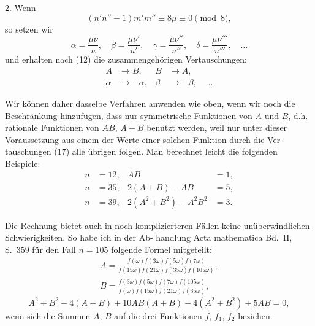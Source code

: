 \documentclass[12pt,a4paper]{article}
\theoremstyle{definition}
\begin{document}
2. Wenn
\begin{equation}\tag{20}
(n'n'' - 1)m'm'' \equiv 8\mu \equiv 0 \pmod{8},
\end{equation}
so setzen wir
\begin{equation}
\alpha = \frac{\mu \nu}{u}, \quad
\beta = \frac{\mu \nu'}{u'}, \quad
\gamma = \frac{\mu \nu''}{u''}, \quad
\delta = \frac{\mu \nu'''}{u'''}, \quad \ldots
\end{equation}
und erhalten nach (12) die zusammengeh\"origen Vertauschungen:
\begin{equation}\tag{21}
\begin{aligned}
A &\rightarrow B, & B &\rightarrow A, \\
\alpha &\rightarrow -\alpha, & \beta &\rightarrow -\beta, \quad \ldots
\end{aligned}
\end{equation}

Wir k\"onnen daher dasselbe Verfahren anwenden wie oben, wenn
wir noch die Beschr\"ankung hinzuf\"ugen, dass nur symmetrische
Funktionen von $A$ und $B$, d.h. rationale Funktionen von $AB$,
$A + B$ benutzt werden, weil nur unter dieser Voraussetzung
aus einem der Werte einer solchen Funktion durch die Ver-
tauschungen (17) alle \"ubrigen folgen. Man berechnet leicht die
folgenden Beispiele:
\begin{equation}\tag{22}
\begin{aligned}
n &= 12, & AB &= 1, \\
n &= 35, & 2(A+B) - AB &= 5, \\
n &= 39, & 2(A^2+B^2) - A^2B^2 &= 3.
\end{aligned}
\end{equation}

Die Rechnung bietet auch in noch komplizierteren F\"allen
keine un\"uberwindlichen Schwierigkeiten. So habe ich in der Ab-
handlung Acta mathematica Bd.~II, S.~359 f\"ur den Fall $n = 105$
folgende Formel mitgeteilt:
\begin{gather*}
A = \frac{f(\omega)f(3\omega)f(5\omega)f(7\omega)}{f(15\omega)f(21\omega)f(35\omega)f(105\omega)}, \\
B = \frac{f(3\omega)f(5\omega)f(7\omega)f(105\omega)}{f(\omega)f(15\omega)f(21\omega)f(35\omega)},
\end{gather*}
\begin{equation*}
A^2 + B^2 - 4(A+B) + 10AB(A+B) - 4(A^2+B^2) + 5AB = 0,
\end{equation*}
wenn sich die Summen $A$, $B$ auf die drei Funktionen
$f$, $f_1$, $f_2$ beziehen.
\end{document}
